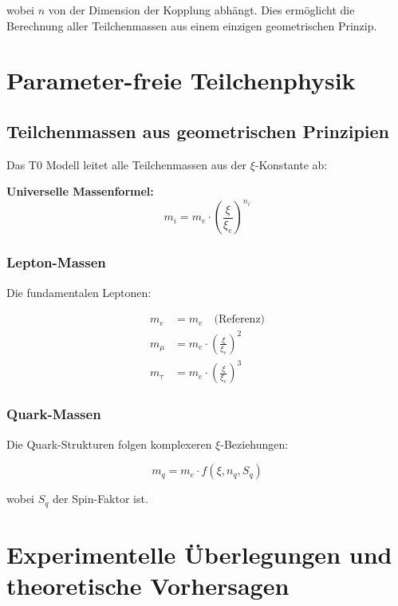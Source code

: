 \documentclass[12pt,a4paper]{report}
\begin{document}
wobei $n$ von der Dimension der Kopplung abhängt. Dies ermöglicht die Berechnung aller Teilchenmassen aus einem einzigen geometrischen Prinzip.

	
	\chapter{Parameter-freie Teilchenphysik}
	
	\section{Teilchenmassen aus geometrischen Prinzipien}
	
	Das T0 Modell leitet alle Teilchenmassen aus der $\xi$-Konstante ab:
	
	\begin{formel}
		\textbf{Universelle Massenformel:}
		\begin{equation}
			m_i = m_e \cdot \left(\frac{\xi}{\xi_e}\right)^{n_i}
		\end{equation}
	\end{formel}
	
	\subsection{Lepton-Massen}
	
	Die fundamentalen Leptonen:
	
	\begin{align}
		m_e &= m_e \quad \text{(Referenz)} \\
		m_\mu &= m_e \cdot \left(\frac{\xi}{\xi_e}\right)^2 \\
		m_\tau &= m_e \cdot \left(\frac{\xi}{\xi_e}\right)^3
	\end{align}
	
	\subsection{Quark-Massen}
	
	Die Quark-Strukturen folgen komplexeren $\xi$-Beziehungen:
	
	\begin{equation}
		m_q = m_e \cdot f(\xi, n_q, S_q)
	\end{equation}
	
	wobei $S_q$ der Spin-Faktor ist.
	
	\chapter{Experimentelle Überlegungen und theoretische Vorhersagen}
	
\end{document}
